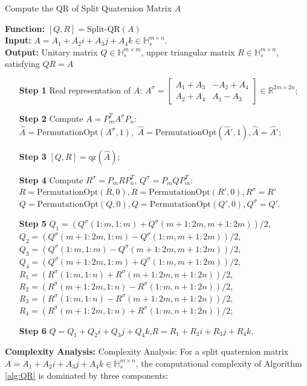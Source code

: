 \documentclass[preprint,12pt]{elsarticle}
\numberwithin{equation}{section}
\begin{document}
\linespread{1.1}
\begin{algorithm}[htbp] 
        \caption{Compute the QR of Split Quaternion Matrix \(A\)}
        \label{alg:QR}
        \textbf{Function:} $[Q, R]=\text{Split-QR}(A)$\\
        \textbf{Input:} \(A = A_1 + A_2 i + A_3 j + A_4 k \in \mathbb{H}_s^{m\times n}\). \\
        {\textbf{Output:}  }  Unitary matrix \(Q \in \mathbb{H}_s^{m\times m}\), upper triangular matrix \(R \in \mathbb{H}_s^{m\times n}\), satisfying \(Q  R = A\) 
    \begin{itemize}
        \item[\textbf{Step 1}] Real representation of $A$: \(A^\sigma = \begin{bmatrix}
            A_1 + A_3 & -A_2 + A_4 \\ A_2 + A_4 & A_1 - A_3
            \end{bmatrix} \in \mathbb{R}^{2m\times 2n}\);
         \item[\textbf{Step 2}] Compute \(A = P_{m}^T A^\sigma P_{n}\): \\$\hat{A}=\text{PermutationOpt}(A^\sigma,1),$ $\hat{A}=\text{PermutationOpt}(\hat{A}',1),\hat{A}=\hat{A}';$
        \item[\textbf{Step 3}] \([Q,R] = \text{qr}(\hat{A})\);
        \item[\textbf{Step 4}] Compute \(R^\sigma = P_{m}RP_{n}^T\), \(Q^\sigma = P_{m}QP_{m}^T\):\\
        $R=\text{PermutationOpt}(R,0),R=\text{PermutationOpt}(R',0),R^\sigma=R'$\\
        $Q=\text{PermutationOpt}(Q,0),Q=\text{PermutationOpt}(Q',0),Q^\sigma=Q'.$
        \item[\textbf{Step 5}] \(Q_1 = (Q^\sigma(1:m,1:m) + Q^\sigma(m+1:2m,m+1:2m))/2\),
           \(Q_2 = (Q^\sigma(m+1:2m,1:m) - Q^\sigma(1:m,m+1:2m))/2\),
            \(Q_3 = (Q^\sigma(1:m,1:m) - Q^\sigma(m+1:2m,m+1:2m))/2\),
            \(Q_4 = (Q^\sigma(m+1:2m,1:m) + Q^\sigma(1:m,m+1:2m))/2\),
            \(R_1 = (R^\sigma(1:m,1:n) + R^\sigma(m+1:2m,n+1:2n))/2\),
            \(R_2 = (R^\sigma(m+1:2m,1:n) - R^\sigma(1:m,n+1:2n))/2\),
            \(R_3 = (R^\sigma(1:m,1:n) - R^\sigma(m+1:2m,n+1:2n))/2\),
            \(R_4 = (R^\sigma(m+1:2m,1:n) + R^\sigma(1:m,n+1:2n))/2\);
        \item[\textbf{Step 6}] \(Q = Q_1 + Q_2i + Q_3j + Q_4k\),\quad\(R = R_1 + R_2i + R_3j + R_4k\),
        \end{itemize}
\end{algorithm}
\textbf{Complexity Analysis:}
{Complexity Analysis:} For a split quaternion matrix \(A = A_1 + A_2i + A_3j + A_4k \in \mathbb{H}_s^{m \times n}\), the computational complexity of Algorithm \ref{alg:QR} is dominated by three components:  
\end{document}
